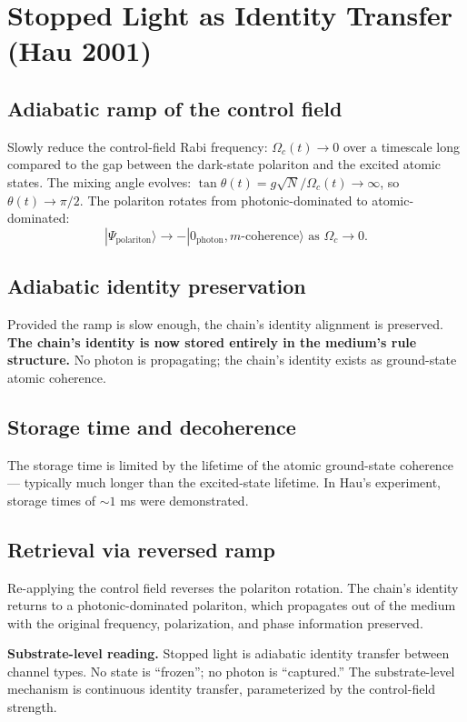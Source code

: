 \documentclass[11pt,a4paper]{article}
\begin{document}
\section{Stopped Light as Identity Transfer (Hau 2001)}

\subsection{Adiabatic ramp of the control field}

Slowly reduce the control-field Rabi frequency: $\Omega_c(t) \to 0$ over a timescale long compared to the gap between the dark-state polariton and the excited atomic states. The mixing angle evolves: $\tan\theta(t) = g\sqrt N/\Omega_c(t) \to \infty$, so $\theta(t) \to \pi/2$. The polariton rotates from photonic-dominated to atomic-dominated:
\[
|\Psi_{\mathrm{polariton}}\rangle \to -|0_{\mathrm{photon}}, m\text{-coherence}\rangle \text{ as } \Omega_c \to 0.
\]

\subsection{Adiabatic identity preservation}

Provided the ramp is slow enough, the chain's identity alignment is preserved. \textbf{The chain's identity is now stored entirely in the medium's rule structure.} No photon is propagating; the chain's identity exists as ground-state atomic coherence.

\subsection{Storage time and decoherence}

The storage time is limited by the lifetime of the atomic ground-state coherence --- typically much longer than the excited-state lifetime. In Hau's experiment, storage times of $\sim 1$ ms were demonstrated.

\subsection{Retrieval via reversed ramp}

Re-applying the control field reverses the polariton rotation. The chain's identity returns to a photonic-dominated polariton, which propagates out of the medium with the original frequency, polarization, and phase information preserved.

\textbf{Substrate-level reading.} Stopped light is adiabatic identity transfer between channel types. No state is ``frozen''; no photon is ``captured.'' The substrate-level mechanism is continuous identity transfer, parameterized by the control-field strength.
\end{document}
